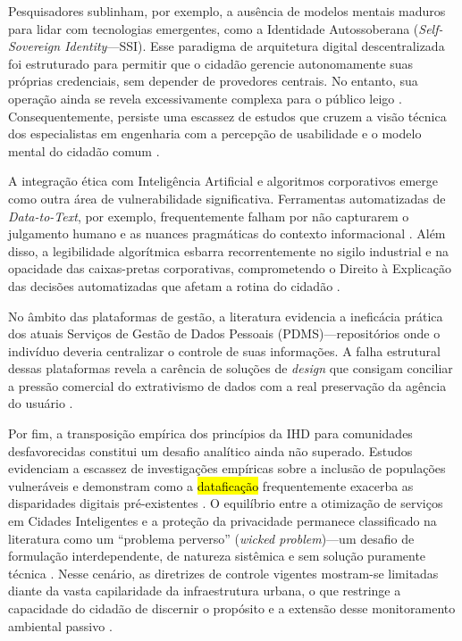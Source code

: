 \documentclass[12pt]{article}
\newcommand{\hlcite}[1]{\colorbox{yellow}{\cite{#1}}} %
\begin{document}
{{    Pesquisadores sublinham, por exemplo, a ausência de modelos mentais maduros para lidar com tecnologias emergentes, como a Identidade Autossoberana (\textit{Self-Sovereign Identity}---SSI). Esse paradigma de arquitetura digital descentralizada foi estruturado para permitir que o cidadão gerencie autonomamente suas próprias credenciais, sem depender de provedores centrais. No entanto, sua operação ainda se revela excessivamente complexa para o público leigo \cite{Lockwood2021, Lockwood2020AnAccessible}. Consequentemente, persiste uma escassez de estudos que cruzem a visão técnica dos especialistas em engenharia com a percepção de usabilidade e o modelo mental do cidadão comum \hlcite{Lockwood2020AnAccessible}.

   A integração ética com Inteligência Artificial e algoritmos corporativos emerge como outra área de vulnerabilidade significativa. Ferramentas automatizadas de \textit{Data-to-Text}, por exemplo, frequentemente falham por não capturarem o julgamento humano e as nuances pragmáticas do contexto informacional \hlcite{Haghighati2020}. Além disso, a legibilidade algorítmica esbarra recorrentemente no sigilo industrial e na opacidade das caixas-pretas corporativas, comprometendo o Direito à Explicação das decisões automatizadas que afetam a rotina do cidadão \cite{Barreto2018} \hlcite{DeAlmeida2019}.

    No âmbito das plataformas de gestão, a literatura evidencia a ineficácia prática dos atuais Serviços de Gestão de Dados Pessoais (PDMS)---repositórios onde o indivíduo deveria centralizar o controle de suas informações. A falha estrutural dessas plataformas revela a carência de soluções de \textit{design} que consigam conciliar a pressão comercial do extrativismo de dados com a real preservação da agência do usuário \hlcite{angelopoulos2021stewardship}.

    Por fim, a transposição empírica dos princípios da IHD para comunidades desfavorecidas constitui um desafio analítico ainda não superado. Estudos evidenciam a escassez de investigações empíricas sobre a inclusão de populações vulneráveis e demonstram como a \hl{dataficação} frequentemente exacerba as disparidades digitais pré-existentes \cite{hayes2024making, Locoro2020}. O equilíbrio entre a otimização de serviços em Cidades Inteligentes e a proteção da privacidade permanece classificado na literatura como um ``problema perverso'' (\textit{wicked problem})---um desafio de formulação interdependente, de natureza sistêmica e sem solução puramente técnica \cite{Meireles2016, Chowdhury2016}. Nesse cenário, as diretrizes de controle vigentes mostram-se limitadas diante da vasta capilaridade da infraestrutura urbana, o que restringe a capacidade do cidadão de discernir o propósito e a extensão desse monitoramento ambiental passivo \cite{Mashhadi2014}.


}}
\end{document}

